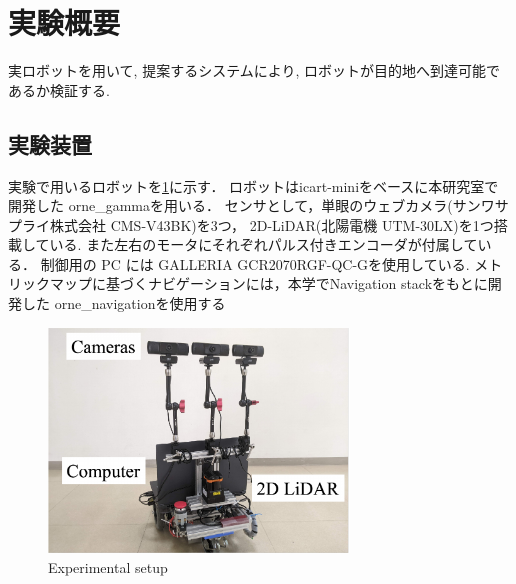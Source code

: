 \section{実験概要}
実ロボットを用いて, 提案するシステムにより, 
ロボットが目的地へ到達可能であるか検証する.
\subsection{実験装置}
実験で用いるロボットを\ref{fig:gamma}に示す．
ロボットはicart-mini\cite{icart}をベースに本研究室で開発した
orne\_gammaを用いる．
センサとして，単眼のウェブカメラ(サンワサプライ株式会社 CMS-V43BK)を3つ，
2D-LiDAR(北陽電機 UTM-30LX)を1つ搭載している. 
また左右のモータにそれぞれパルス付きエンコーダが付属している．
制御用の PC には GALLERIA GCR2070RGF-QC-Gを使用している.
メトリックマップに基づくナビゲーションには，本学でNavigation stackをもとに開発した
orne\_navigation\cite{orne_nav}を使用する
\begin{figure}[htbp]
    \centering
     \includegraphics[width=80mm]{images/pdf/gamma_sensor.pdf}
     \caption{Experimental setup}\label{fig:gamma}
\end{figure}

\newpage

